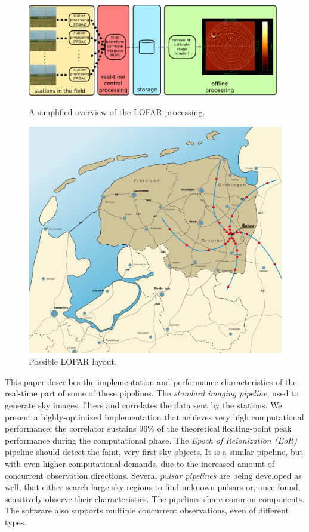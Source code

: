 \documentclass{sig-alternate}
\begin{document}
\begin{figure}
\begin{minipage}[b]{11cm}
\includegraphics[width=11cm]{lofar-overview.pdf}
\caption{A simplified overview of the LOFAR processing.}
\label{fig:lofar-overview}
\end{minipage}
\hfill
\begin{minipage}[b]{6cm}
\includegraphics[width=\columnwidth]{map.jpg}
\caption{Possible LOFAR layout.}
\label{fig:map}
\end{minipage}
\end{figure}

This paper describes the implementation and performance characteristics of
the real-time part of some of these pipelines.
The \emph{standard imaging pipeline}, used to generate sky images,
filters and correlates the data sent by the stations.
We present a highly-optimized implementation that achieves very high
computational performance: the correlator sustains 96\% of the theoretical
floating-point peak performance during the computational phase.
The \emph{Epoch of Reionization (EoR)\/} pipeline should detect the faint,
very first sky objects.
It is a similar pipeline, but with even higher computational demands, due to
the increased amount of concurrent observation directions.
Several \emph{pulsar pipelines\/} are being developed as well, that either
search large sky regions to find unknown pulsars or, once found, sensitively
observe their characteristics.
The pipelines share common components.
The software also supports multiple concurrent observations, even of different
types.
\end{document}
